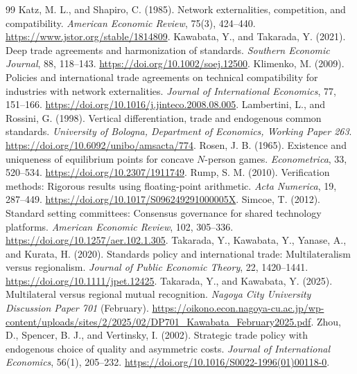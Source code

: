 \documentclass[11pt,a4paper]{article}
\theoremstyle{remark}\newtheorem{remark}[theorem]{Remark}
\begin{document}
\begin{thebibliography}{99}
 Katz, M. L., and Shapiro, C. (1985). Network externalities, competition, and compatibility. \emph{American Economic Review}, 75(3), 424--440. \url{https://www.jstor.org/stable/1814809}.
 Kawabata, Y., and Takarada, Y. (2021). Deep trade agreements and harmonization of standards. \emph{Southern Economic Journal}, 88, 118--143. \url{https://doi.org/10.1002/soej.12500}.
 Klimenko, M. (2009). Policies and international trade agreements on technical compatibility for industries with network externalities. \emph{Journal of International Economics}, 77, 151--166. \url{https://doi.org/10.1016/j.jinteco.2008.08.005}.
 Lambertini, L., and Rossini, G. (1998). Vertical differentiation, trade and endogenous common standards. \emph{University of Bologna, Department of Economics, Working Paper 263}. \url{https://doi.org/10.6092/unibo/amsacta/774}.
 Rosen, J. B. (1965). Existence and uniqueness of equilibrium points for concave $N$-person games. \emph{Econometrica}, 33, 520--534. \url{https://doi.org/10.2307/1911749}.
 Rump, S. M. (2010). Verification methods: Rigorous results using floating-point arithmetic. \emph{Acta Numerica}, 19, 287--449. \url{https://doi.org/10.1017/S096249291000005X}.
 Simcoe, T. (2012). Standard setting committees: Consensus governance for shared technology platforms. \emph{American Economic Review}, 102, 305--336. \url{https://doi.org/10.1257/aer.102.1.305}.
 Takarada, Y., Kawabata, Y., Yanase, A., and Kurata, H. (2020). Standards policy and international trade: Multilateralism versus regionalism. \emph{Journal of Public Economic Theory}, 22, 1420--1441. \url{https://doi.org/10.1111/jpet.12425}.
 Takarada, Y., and Kawabata, Y. (2025). Multilateral versus regional mutual recognition. \emph{Nagoya City University Discussion Paper 701} (February). \url{https://oikono.econ.nagoya-cu.ac.jp/wp-content/uploads/sites/2/2025/02/DP701_Kawabata_February2025.pdf}.
 Zhou, D., Spencer, B. J., and Vertinsky, I. (2002). Strategic trade policy with endogenous choice of quality and asymmetric costs. \emph{Journal of International Economics}, 56(1), 205--232. \url{https://doi.org/10.1016/S0022-1996(01)00118-0}.
\end{thebibliography}
\end{document}
